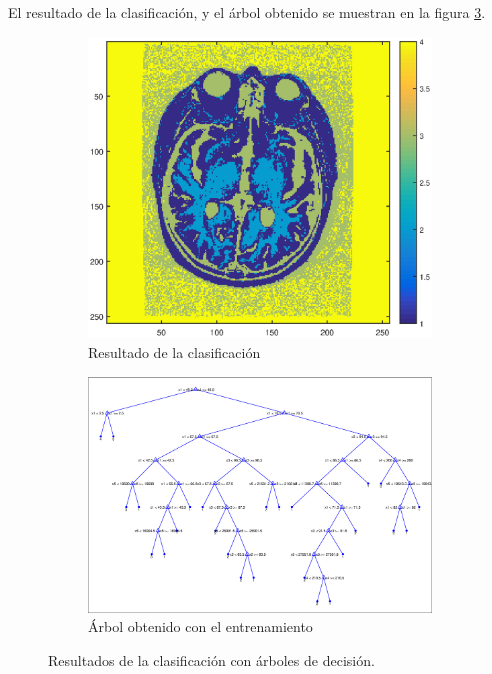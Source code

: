 \documentclass[11pt]{article} %
\begin{document}
El resultado de la clasificación, y el árbol obtenido se muestran en la figura \ref{fig:tree}.

\begin{figure}[h]
	\centering
	\begin{subfigure}[b]{0.435\textwidth}
		\includegraphics[width=\textwidth]{../3_TREE/1_classification.eps}
		\caption[]{\small Resultado de la clasificación}
		\label{fig:tree:class}
	\end{subfigure}
	\quad
	\begin{subfigure}[b]{0.435\textwidth}
		\includegraphics[width=\textwidth]{../3_TREE/1_tree.eps}
		\caption[]{\small Árbol obtenido con el entrenamiento}
		\label{fig:tree:conf}
	\end{subfigure}
	\caption{Resultados de la clasificación con árboles de decisión.}
	\label{fig:tree}
\end{figure}
\end{document}
